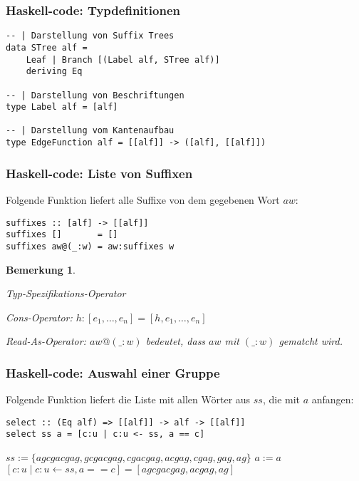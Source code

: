 \documentclass{beamer}
\newtheorem{remark}{Bemerkung}
\begin{document}
\begin{frame}[fragile]
\frametitle{Haskell-code: Typdefinitionen}
\begin{lstlisting}
-- | Darstellung von Suffix Trees
data STree alf =
    Leaf | Branch [(Label alf, STree alf)]
    deriving Eq

-- | Darstellung von Beschriftungen
type Label alf = [alf]

-- | Darstellung vom Kantenaufbau
type EdgeFunction alf = [[alf]] -> ([alf], [[alf]])
\end{lstlisting}
\end{frame}

\begin{frame}[fragile]
\frametitle{Haskell-code: Liste von Suffixen}
Folgende Funktion liefert alle Suffixe von dem gegebenen Wort $aw$:
\begin{lstlisting}
suffixes :: [alf] -> [[alf]]
suffixes []       = []
suffixes aw@(_:w) = aw:suffixes w
\end{lstlisting}
\bigskip
\begin{remark}
\begin{description}[l]
    \item[Operator $(::)$] Typ-Spezifikations-Operator
    \item[Operator $(:)$] Cons-Operator: $h:[e_1, \dots, e_n] = [h, e_1, \dots, e_n]$
    \item[Operator $(@)$] Read-As-Operator: $aw@(\_:w)$ bedeutet, dass $aw$ mit $(\_:w)$ gematcht wird.
\end{description}
\end{remark}
\end{frame}

\begin{frame}[fragile]
\frametitle{Haskell-code: Auswahl einer Gruppe}
Folgende Funktion liefert die Liste mit allen Wörter aus $ss$, die mit $a$ anfangen:
\begin{lstlisting}
select :: (Eq alf) => [[alf]] -> alf -> [[alf]]
select ss a = [c:u | c:u <- ss, a == c]
\end{lstlisting}
\begin{example}
    $ss := \{ agcgacgag, gcgacgag, cgacgag, acgag, cgag, gag, ag\}$
    $a := a$ \\
    $[c:u \mid c:u \leftarrow ss, a == c] = [agcgacgag,acgag,ag]$
\end{example}
\end{frame}
\end{document}
